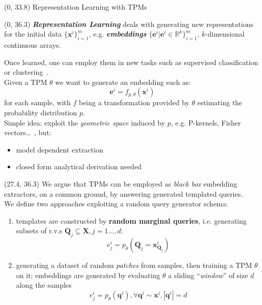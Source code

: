 \documentclass[final]{beamer}
\begin{document}
\begin{frame}{}
\begin{textblock}{52.5}
  \end{textblock}
  
  \begin{textblock}{80}(0, 33.8)
    Representation Learning with TPMs
  \end{textblock}
  
  \begin{textblock}{25.2}(0, 36.3)
    \small
    \textbf{\emph{Representation Learning}} deals with generating new
    representations for the initial data $\{\mathbf x^i\}_{i=1}^m$,
    e.g. \textbf{\emph{embeddings}}
    $\{\mathbf{e}^i|\mathbf{e}^i\in\mathbb{R}^{k}\}_{i=1}^m $,
    $k$-dimensional continuous arrays.\par
    Once learned, one can employ them in new tasks such as
    supervised classification or
    clustering~\parencite{Bengio2012}.\\[20pt]

    Given a TPM $\theta$ we want to generate an embedding such as:
    $$\mathbf{e}^{i}=f_{p,\theta}(\mathbf{x}^{i})$$
    for each sample, with $f$ being a transformation provided by $\theta$ estimating the
    probability distribution $p$.\\[20pt]

    Simple idea: exploit the \emph{geometric space} induced by $p$,
    e.g. P-kernels, Fisher vectors\dots~\parencite{Shawe-Taylor2004},
    but:
    \begin{itemize}
    \item model dependent extraction
      \item closed form analytical derivation needed
    \end{itemize}
    
  \end{textblock}
  
  \begin{textblock}{25.2}(27.4, 36.3)
    \small
    We argue that TPMs can be employed as \emph{black box} embedding
    extractors, on a common ground, by answering generated templated
    queries.\\[20pt]

    We define two approaches exploiting a random query generator
    schema:
    \begin{enumerate}[I]
    \item templates are constructed by \textbf{random marginal
      queries}, i.e. generating subsets of r.v.s $\mathbf{Q}_{j} \subseteq
    \mathbf{X}, j = 1\dots,d$:
    $$e_{j}^{i}=p_{\theta}(\mathbf{Q}_{j}=\mathbf{x}^{i}_{\mathbf{Q}_{j}})$$
  \item generating a dataset of random \emph{patches} from samples,
    then training a TPM $\theta$ on it; embeddings are generated by evaluating $\theta$
    a sliding ``\emph{window}'' of size $d$ along the samples
    $$e_{j}^{i}=p_{\theta}(\mathbf{q}^{i}),\forall \mathbf{q}^{i}\sim \mathbf{x}^{i}, |\mathbf{q}^{i}|=d$$
  \end{enumerate}\bigskip


\end{textblock}
\end{frame}
\end{document}
